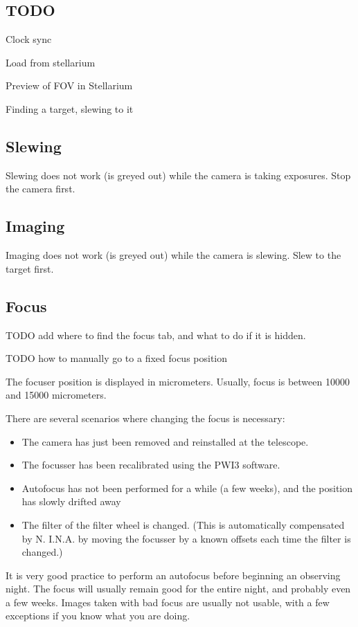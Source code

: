 \documentclass[a4paper, 11pt, fleqn]{memoir}
\begin{document}
\subsection{TODO}
Clock sync

Load from stellarium

Preview of FOV in Stellarium

Finding a target, slewing to it

\subsection{Slewing}

Slewing does not work (is greyed out) while the camera is taking exposures.
Stop the camera first.

\subsection{Imaging}

Imaging does not work (is greyed out) while the camera is slewing.
Slew to the target first.

\subsection{Focus}

TODO add where to find the focus tab, and what to do if it is hidden.

TODO how to manually go to a fixed focus position

The focuser position is displayed in micrometers.
Usually, focus is between 10000 and 15000 micrometers.

There are several scenarios where changing the focus is necessary:
\begin{itemize}
    \item The camera has just been removed and reinstalled at the telescope.
    \item
          The focusser has been recalibrated using the PWI3 software.
    \item
          Autofocus has not been performed for a while (a few weeks), and the position has slowly drifted away
    \item
          The filter of the filter wheel is changed. (This is automatically compensated by N.
          I.N.A.
          by moving the focusser by a known offsets each time the filter is changed.)
\end{itemize}

It is very good practice to perform an autofocus before beginning an observing night.
The focus will usually remain good for the entire night, and probably even a few weeks.
Images taken with bad focus are usually not usable, with a few exceptions if you know what you are doing.
\end{document}
